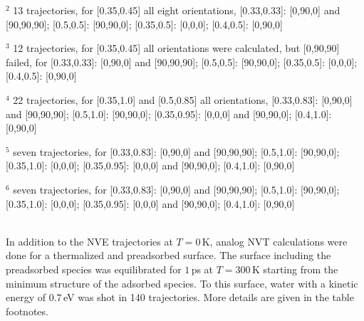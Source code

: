 \documentclass[11pt,DIV=13,BCOR=5mm,a4paper,headinclude]{scrbook}
\begin{document}
\begin{table}[hbt]
\begin{tablenotes}
\item[]$^2$ 13 trajectories, for [0.35,0.45] all eight orientations, [0.33,0.33]: [0,90,0] and [90,90,90]; [0.5,0.5]: [90,90,0]; [0.35,0.5]: [0,0,0]; [0.4,0.5]: [0,90,0]
\item[]$^3$ 12 trajectories, for [0.35,0.45] all orientations were calculated, but [0,90,90] failed, for [0.33,0.33]: [0,90,0] and [90,90,90]; [0.5,0.5]: [90,90,0]; [0.35,0.5]: [0,0,0]; [0.4,0.5]: [0,90,0]
\item[] $^4$ 22 trajectories, for [0.35,1.0] and [0.5,0.85] all orientations, [0.33,0.83]: [0,90,0] and [90,90,90]; [0.5,1.0]: [90,90,0]; [0.35,0.95]: [0,0,0] and [90,90,0]; [0.4,1.0]: [0,90,0]
\item[]$^5$ seven trajectories, for [0.33,0.83]: [0,90,0] and [90,90,90]; [0.5,1.0]: [90,90,0]; [0.35,1.0]: [0,0,0]; [0.35,0.95]: [0,0,0] and [90,90,0]; [0.4,1.0]: [0,90,0]
\item[]$^6$ seven trajectories, for [0.33,0.83]: [0,90,0] and [90,90,90]; [0.5,1.0]: [90,90,0]; [0.35,1.0]: [0,0,0]; [0.35,0.95]: [0,0,0] and [90,90,0]; [0.4,1.0]: [0,90,0]
\end{tablenotes}
 \label{tab:enh_micro}
\end{table}
\\
In addition to the NVE trajectories at $T=0\,$K, analog NVT calculations were done for a thermalized and preadsorbed surface.
The surface including the preadsorbed species was equilibrated for $1\,$ps at $T=300\,$K starting from the minimum structure of the adsorbed species.
To this surface, water with a kinetic energy of $0.7\,$eV was shot in 140 trajectories.
More details are given in the table footnotes.
\end{document}
